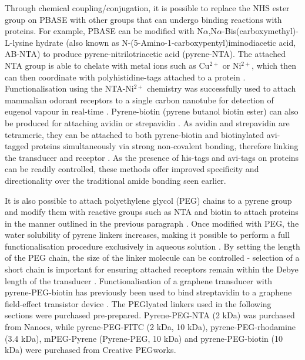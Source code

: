 \documentclass[
  a4paper,
]{scrbook}
\begin{document}
Through chemical coupling/conjugation, it is possible to replace the NHS
ester group on PBASE with other groups that can undergo binding
reactions with proteins. For example, PBASE can be modified with
N\(\alpha\),N\(\alpha\)-Bis(carboxymethyl)-L-lysine hydrate (also known
as N-(5-Amino-1-carboxypentyl)iminodiacetic acid, AB-NTA) to produce
pyrene-nitrilotriacetic acid (pyrene-NTA). The attached NTA group is
able to chelate with metal ions such as Cu\(^{2+}\) or Ni\(^{2+}\),
which then can then coordinate with polyhistidine-tags attached to a
protein \autocite{Holzinger2011,Amano2016}. Functionalisation using the
NTA-Ni\(^{2+}\) chemistry was successfully used to attach mammalian
odorant receptors to a single carbon nanotube for detection of eugenol
vapour in real-time \autocite{Goldsmith2011}. Pyrene-biotin (pyrene
butanol biotin ester) can also be produced for attaching avidin or
strepavidin \autocite{Holzinger2011}. As avidin and strepavidin are
tetrameric, they can be attached to both pyrene-biotin and biotinylated
avi-tagged proteins simultaneously via strong non-covalent bonding,
therefore linking the transducer and receptor
\autocite{Star2003a,Dundas2013,Hermanson2013-11,Fairhead2015}. As the
presence of his-tags and avi-tags on proteins can be readily controlled,
these methods offer improved specificity and directionality over the
traditional amide bonding seen earlier.

It is also possible to attach polyethylene glycol (PEG) chains to a
pyrene group and modify them with reactive groups such as NTA and biotin
to attach proteins in the manner outlined in the previous paragraph
\autocite{Hermanson2013-18,Meran2018}. Once modified with PEG, the water
solubility of pyrene linkers increases, making it possible to perform a
full functionalisation procedure exclusively in aqueous solution
\autocite{Hermanson2013-18}. By setting the length of the PEG chain, the
size of the linker molecule can be controlled - selection of a short
chain is important for ensuring attached receptors remain within the
Debye length of the transducer \autocite{Shkodra2021}. Functionalisation
of a graphene transducer with pyrene-PEG-biotin has previously been used
to bind streptavidin to a graphene field-effect transistor device
\autocite{Miki2019}. The PEGlyated linkers used in the following
sections were purchased pre-prepared. Pyrene-PEG-NTA (2 kDa) was
purchased from Nanocs, while pyrene-PEG-FITC (2 kDa, 10 kDa),
pyrene-PEG-rhodamine (3.4 kDa), mPEG-Pyrene (Pyrene-PEG, 10 kDa) and
pyrene-PEG-biotin (10 kDa) were purchased from Creative PEGworks.
\end{document}
